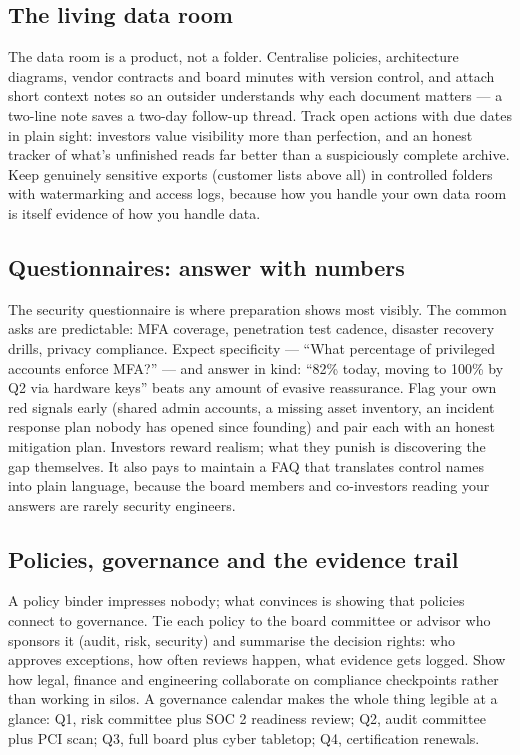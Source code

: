 \subsection{The living data room}


The data room is a product, not a folder. Centralise policies, architecture diagrams, vendor contracts and board minutes with version control, and attach short context notes so an outsider understands why each document matters — a two-line note saves a two-day follow-up thread. Track open actions with due dates in plain sight: investors value visibility more than perfection, and an honest tracker of what's unfinished reads far better than a suspiciously complete archive. Keep genuinely sensitive exports (customer lists above all) in controlled folders with watermarking and access logs, because how you handle your own data room is itself evidence of how you handle data.



\subsection{Questionnaires: answer with numbers}


The security questionnaire is where preparation shows most visibly. The common asks are predictable: MFA coverage, penetration test cadence, disaster recovery drills, privacy compliance. Expect specificity — ``What percentage of privileged accounts enforce MFA?'' — and answer in kind: ``82\% today, moving to 100\% by Q2 via hardware keys'' beats any amount of evasive reassurance. Flag your own red signals early (shared admin accounts, a missing asset inventory, an incident response plan nobody has opened since founding) and pair each with an honest mitigation plan. Investors reward realism; what they punish is discovering the gap themselves. It also pays to maintain a FAQ that translates control names into plain language, because the board members and co-investors reading your answers are rarely security engineers.



\subsection{Policies, governance and the evidence trail}


A policy binder impresses nobody; what convinces is showing that policies connect to governance. Tie each policy to the board committee or advisor who sponsors it (audit, risk, security) and summarise the decision rights: who approves exceptions, how often reviews happen, what evidence gets logged. Show how legal, finance and engineering collaborate on compliance checkpoints rather than working in silos. A governance calendar makes the whole thing legible at a glance: Q1, risk committee plus SOC 2 readiness review; Q2, audit committee plus PCI scan; Q3, full board plus cyber tabletop; Q4, certification renewals.


